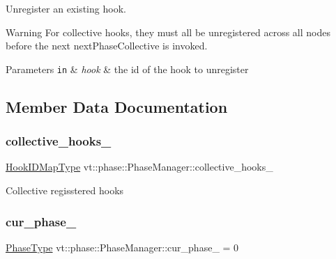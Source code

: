 Unregister an existing hook. 

\begin{DoxyWarning}{Warning}
For collective hooks, they must all be unregistered across all nodes before the next {\ttfamily next\+Phase\+Collective} is invoked.
\end{DoxyWarning}

\begin{DoxyParams}[1]{Parameters}
\mbox{\tt in}  & {\em hook} & the id of the hook to unregister \\
\hline
\end{DoxyParams}


\subsection{Member Data Documentation}
\mbox{\label{structvt_1_1phase_1_1_phase_manager_aafc873771fb849243f082cba71f36672}} 
\subsubsection{\texorpdfstring{collective\+\_\+hooks\+\_\+}{collective\_hooks\_}}
{\footnotesize\ttfamily \hyperlink{structvt_1_1phase_1_1_phase_manager_a7f9784fa7550beaa1e7d59e639169a8b}{Hook\+I\+D\+Map\+Type} vt\+::phase\+::\+Phase\+Manager\+::collective\+\_\+hooks\+\_\+\hspace{0.3cm}{\ttfamily [private]}}

Collective regisstered hooks \mbox{\label{structvt_1_1phase_1_1_phase_manager_a481f6b2da9da107b31d6ce8d970c7aff}} 
\subsubsection{\texorpdfstring{cur\+\_\+phase\+\_\+}{cur\_phase\_}}
{\footnotesize\ttfamily \hyperlink{namespacevt_a46ce6733d5cdbd735d561b7b4029f6d7}{Phase\+Type} vt\+::phase\+::\+Phase\+Manager\+::cur\+\_\+phase\+\_\+ = 0\hspace{0.3cm}{\ttfamily [private]}}

